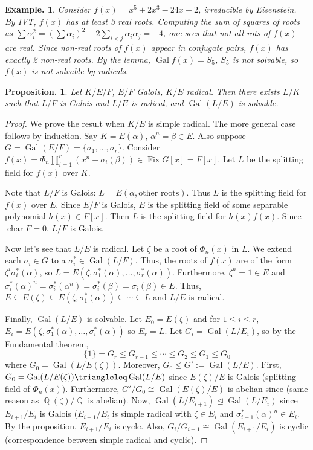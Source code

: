 \documentclass[11pt, a4paper]{memoir}
\DeclareMathOperator{\Q}{{\mathbb{Q}}}
\theoremstyle{change}
\newtheorem{proposition}[theorem]{Proposition.}
\theoremstyle{plain}
\theoremstyle{nonumberplain}
\newtheorem{example}{Example.}
\newtheorem{proof}{Proof}
\DeclareMathOperator{\chr}{char}
\DeclareMathOperator{\Fix}{Fix}
\DeclareMathOperator{\Gal}{Gal}
\numberwithin{equation}{section}
\begin{document}
\begin{example}
    Consider $f(x)=x^5+2x^3-24x-2$, irreducible by Eisenstein.
    By IVT, $f(x)$ has at least 3 real roots.
    Computing the sum of squares of roots as $\sum \alpha_i^2=\left(\sum\alpha_i\right)^2-2\sum_{i<j}\alpha_i\alpha_j=-4$, one sees that not all rots of $f(x)$ are real.
    Since non-real roots of $f(x)$ appear in conjugate pairs, $f(x)$ has exactly 2 non-real roots.
    By the lemma, $\Gal f(x)=S_5$, $S_5$ is not solvable, so $f(x)$ is not solvable by radicals.
\end{example}
\begin{proposition}
    Let $K/E/F$, $E/F$ Galois, $K/E$ radical.
    Then there exists $L/K$ such that $L/F$ is Galois and $L/E$ is radical, and $\Gal(L/E)$ is solvable.
\end{proposition}
\begin{proof}
    We prove the result when $K/E$ is simple radical.
    The more general case follows by induction.
    Say $K=E(\alpha)$, $\alpha^n=\beta\in E$.
    Also suppose $G=\Gal(E/F)=\{\sigma_1,\ldots,\sigma_r\}$.
    Consider $f(x)=\Phi_n\prod_{i=1}^r(x^n-\sigma_i(\beta))\in\Fix G[x]=F[x]$.
    Let $L$ be the splitting field for $f(x)$ over $K$.
    
    Note that $L/F$ is Galois: $L=E(\alpha,\text{other roots})$.
    Thus $L$ is the splitting field for $f(x)$ over $E$.
    Since $E/F$ is Galois, $E$ is the splitting field of some separable polynomial $h(x)\in F[x]$.
    Then $L$ is the splitting field for $h(x)f(x)$.
    Since $\chr F=0$, $L/F$ is Galois.

    Now let's see that $L/E$ is radical.
    Let $\zeta$ be a root of $\Phi_n(x)$ in $L$.
    We extend each $\sigma_i\in G$ to a $\sigma_i^*\in\Gal(L/F)$.
    Thus, the roots of $f(x)$ are of the form $\zeta^i\sigma_i^*(\alpha)$, so $L=E(\zeta,\sigma_1^*(\alpha),\ldots,\sigma_r^*(\alpha))$.
    Furthermore, $\zeta^n=1\in E$ and $\sigma_i^*(\alpha)^n=\sigma_i^*(\alpha^n)=\sigma_i^*(\beta)=\sigma_i(\beta)\in E$.
    Thus, $E\subseteq E(\zeta)\subseteq E(\zeta,\sigma_1^*(\alpha))\subseteq\cdots\subseteq L$ and $L/E$ is radical.

    Finally, $\Gal(L/E)$ is solvable.
    Let $E_0=E(\zeta)$ and for $1\leq i\leq r$, $E_i=E(\zeta,\sigma_1^*(\alpha),\ldots,\sigma_i^*(\alpha))$ so $E_r=L$.
    Let $G_i=\Gal(L/E_i)$, so by the Fundamental theorem,
    \begin{equation*}
        \{1\}=G_r\leq G_{r-1}\leq\cdots\leq G_2\leq G_1\leq G_0
    \end{equation*}
    where $G_0=\Gal(L/E(\zeta))$.
    Moreover, $G_0\leq G':=\Gal(L/E)$.
    First, $G_0=\Gal(L/E(\zeta))\triangleleq\Gal(L/E)$ since $E(\zeta)/E$ is Galois (splitting field of $\Phi_n(x)$).
    Furthermore, $G'/G_0\cong\Gal(E(\zeta)/E)$ is abelian since (same reason as $\Q(\zeta)/\Q$ is abelian).
    Now, $\Gal(L/E_{i+1})\trianglelefteq\Gal(L/E_i)$ since $E_{i+1}/E_i$ is Galois ($E_{i+1}/E_i$ is simple radical with $\zeta\in E_i$ and $\sigma_{i+1}^*(\alpha)^n\in E_i$.
    By the proposition, $E_{i+1}/E_i$ is cyclc.
    Also, $G_i/G_{i+1}\cong\Gal(E_{i+1}/E_i)$ is cyclic (correspondence between simple radical and cyclic).
\end{proof}
\end{document}
